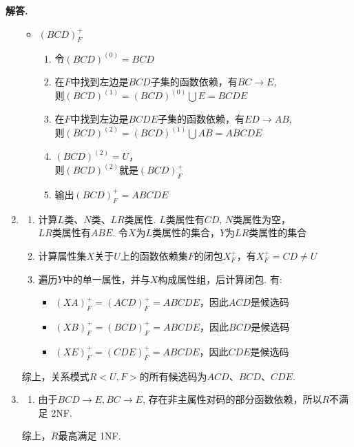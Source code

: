 \documentclass[12pt, a4paper, oneside]{ctexart}
\newenvironment{solution}{\par\noindent\textbf{解答. }}{\par}
\begin{document}
\begin{solution}
\begin{enumerate}[(1)]
\begin{itemize}
                \item $(BCD)_F^+$
                \begin{enumerate}[$1^\circ$]
                    \item 令$(BCD)^{(0)} = BCD$
                    \item 在$F$中找到左边是$BCD$子集的函数依赖，有$BC \rightarrow E$, \\
                    则$(BCD)^{(1)} = (BCD)^{(0)}\bigcup E = BCDE$
                    \item 在$F$中找到左边是$BCDE$子集的函数依赖，有$ED \rightarrow AB$, \\
                    则$(BCD)^{(2)} = (BCD)^{(1)}\bigcup AB = ABCDE$
                    \item $(BCD)^{(2)} = U$，\\
                    则$(BCD)^{(2)}$就是$(BCD)_F^+$
                    \item 输出$(BCD)_F^+ = ABCDE$
                \end{enumerate}
            \end{itemize}
        \item 
            \begin{enumerate}[$1^\circ$]
                \item 计算$L$类、$N$类、$LR$类属性. $L$类属性有$CD$, $N$类属性为空，\\
                $LR$类属性有$ABE$. 令$X$为$L$类属性的集合，$Y$为$LR$类属性的集合
                \item 计算属性集$X$关于$U$上的函数依赖集$F$的闭包$X_F^+$，有$X_F^+ = CD \not= U$
                \item 遍历$Y$中的单一属性，并与$X$构成属性组，后计算闭包. 有:
                    \begin{itemize}
                        \item $(XA)_F^+ = (ACD)_F^+ = ABCDE$，因此$ACD$是候选码
                        \item $(XB)_F^+ = (BCD)_F^+ = ABCDE$，因此$BCD$是候选码
                        \item $(XE)_F^+ = (CDE)_F^+ = ABCDE$，因此$CDE$是候选码
                    \end{itemize}
            \end{enumerate}
            综上，关系模式$R<U, F>$的所有候选码为$ACD$、$BCD$、$CDE$.
        \newpage
        \item 
            \begin{enumerate}[$1^\circ$]
                \item 由于$BCD\rightarrow E, BC\rightarrow E$, 存在非主属性对码的部分函数依赖，所以$R$不满足 2NF.
            \end{enumerate}

            综上，$R$最高满足 1NF.
        \end{enumerate}
\end{solution}
\end{document}
